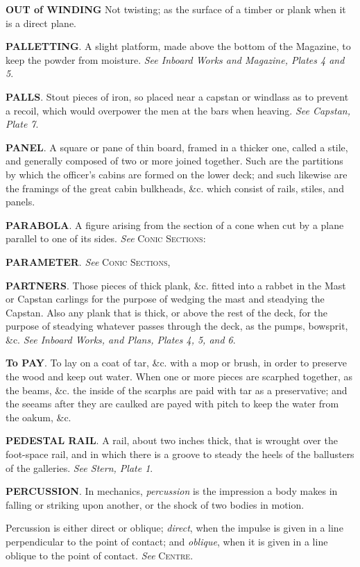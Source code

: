 \textbf{OUT of WINDING} Not twisting; as the surface of a timber or plank when it is a direct plane.

\textbf{PALLETTING}. A slight platform, made above the bottom of the Magazine, to keep the powder from moisture. \textit{See Inboard Works and Magazine, Plates 4 and 5}.

\textbf{PALLS}. Stout pieces of iron, so placed near a capstan or windlass as to prevent a recoil, which would overpower the men at the bars when heaving. \textit{See Capstan, Plate 7}. 

\textbf{PANEL}. A square or pane of thin board, framed in a thicker one, called a stile, and generally composed of two or more joined together. Such are the partitions by which the officer's cabins are formed on the lower deck; and such likewise are the framings of the great cabin bulkheads, \&c. which consist of rails, stiles, and panels. 

\textbf{PARABOLA}. A figure arising from the section of a cone when cut by a plane parallel to one of its sides. \textit{See} \textsc{Conic Sections}: 

\textbf{PARAMETER}. \textit{See} \textsc{Conic Sections}, 

\textbf{PARTNERS}. Those pieces of thick plank, \&c. fitted into a rabbet in the Mast or Capstan carlings for the purpose of wedging the mast and steadying the Capstan. Also any plank that is thick, or above the rest of the deck, for the purpose of steadying whatever passes through the deck, as the pumps, bowsprit, \&c. \textit{See Inboard Works, and Plans, Plates 4, 5, and 6}. 

\textbf{To PAY}. To lay on a coat of tar, \&c. with a mop or brush, in order to preserve the wood and keep out water. When one or more pieces are scarphed together, as the beams, \&c. the inside of the scarphs are paid with tar as a preservative; and the seeams after they are caulked are payed with pitch to keep the water from the oakum, \&c. 

\textbf{PEDESTAL RAIL}. A rail, about two inches thick, that is wrought over the foot-space rail, and in which there is a groove to steady the heels of the ballusters of the galleries. \textit{See Stern, Plate 1}. 

\textbf{PERCUSSION}. In mechanics, \textit{percussion} is the impression a body makes in falling or striking upon another, or the shock of two bodies in motion. 

Percussion is either direct or oblique; \textit{direct}, when the impulse is given in a line perpendicular to the point of contact; and \textit{oblique}, when it is given in a line oblique to the point of contact. \textit{See} \textsc{Centre}. 

